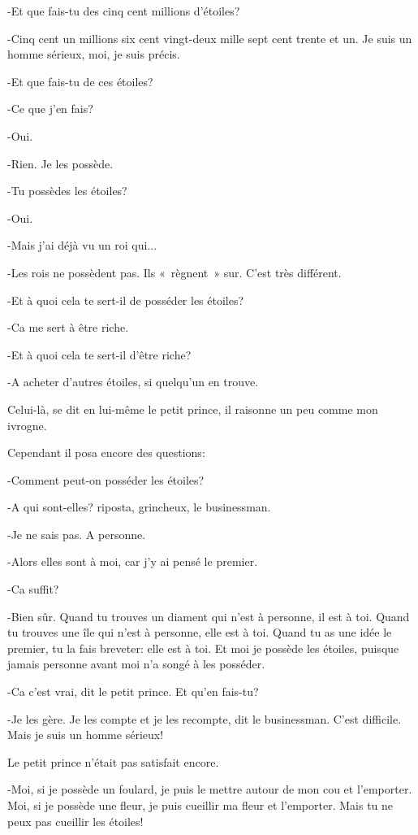 \documentclass{report}
\begin{document}
\begin{paracol}{2}
-Et que fais-tu des cinq cent millions d'étoiles?

-Cinq cent un millions six cent vingt-deux mille sept cent trente et un. Je suis un homme sérieux, moi, je suis précis.

-Et que fais-tu de ces étoiles?

-Ce que j'en fais?

-Oui.

-Rien. Je les possède.

-Tu possèdes les étoiles?

-Oui.

-Mais j'ai déjà vu un roi qui...

-Les rois ne possèdent pas. Ils «~règnent~» sur. C'est très différent.

-Et à quoi cela te sert-il de posséder les étoiles?

-Ca me sert à être riche.

-Et à quoi cela te sert-il d'être riche?

-A acheter d'autres étoiles, si quelqu'un en trouve.

Celui-là, se dit en lui-même le petit prince, il raisonne un peu comme mon ivrogne.

Cependant il posa encore des questions:

-Comment peut-on posséder les étoiles?

-A qui sont-elles? riposta, grincheux, le businessman.

-Je ne sais pas. A personne.

-Alors elles sont à moi, car j'y ai pensé le premier.

-Ca suffit?

-Bien sûr. Quand tu trouves un diament qui n'est à personne, il est à toi. Quand tu trouves une île qui n'est à personne, elle est à toi. Quand tu as une idée le premier, tu la fais breveter: elle est à toi. Et moi je possède les étoiles, puisque jamais personne avant moi n'a songé à les posséder.

-Ca c'est vrai, dit le petit prince. Et qu'en fais-tu?

-Je les gère. Je les compte et je les recompte, dit le businessman. C'est difficile. Mais je suis un homme sérieux!

Le petit prince n'était pas satisfait encore.

-Moi, si je possède un foulard, je puis le mettre autour de mon cou et l'emporter. Moi, si je possède une fleur, je puis cueillir ma fleur et l'emporter. Mais tu ne peux pas cueillir les étoiles!


\end{paracol}
\end{document}
